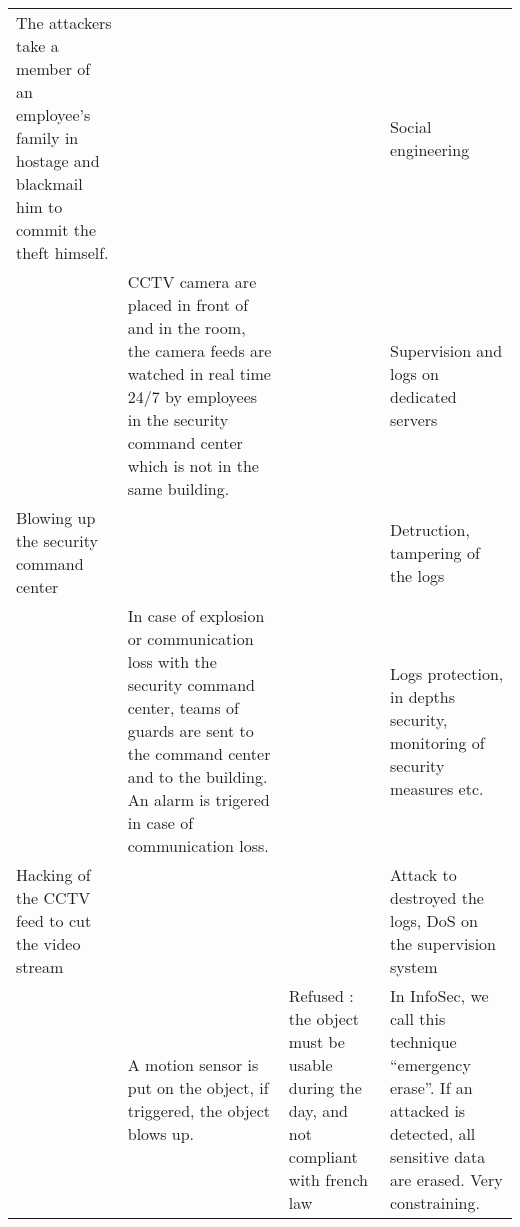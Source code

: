 \documentclass[11pt]{article} %
\begin{document}
\begin{longtable}{|p{3cm}|p{3cm}|p{3cm}|p{3cm}|}
The attackers take a member of an employee's family in hostage and blackmail him to
commit the theft himself. & & & Social engineering \\
& CCTV camera are placed in front of and in the room, the camera feeds are 
watched in real time 24/7 by employees in the security command center which is not 
in the same building. & & Supervision and logs on dedicated servers \\
Blowing up the security command center & & & Detruction, tampering of the logs \\
& In case of explosion or communication loss with the security command center, 
teams of guards are sent to the command center and to the building. An alarm is trigered 
in case of communication loss. & & Logs protection, in depths security, monitoring of security
measures etc. \\
Hacking of the CCTV feed to cut the video stream & & & Attack to destroyed the logs, 
DoS on the supervision system \\
& A motion sensor is put on the object, if triggered, the object blows up. & Refused : the
object must be usable during the day, and not compliant with french law & In InfoSec, 
we call this technique ``emergency erase''. If an attacked is detected, all sensitive data
are erased. Very constraining. \\

\end{longtable}
\end{document}
